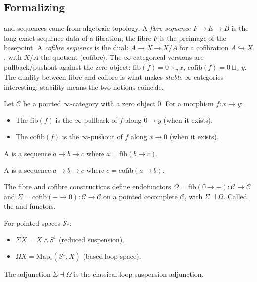 \subsection{Formalizing}

\begin{nameorigin}
 and  sequences come from algebraic topology.
A \emph{fibre sequence} $F \to E \to B$ is the long-exact-sequence
data of a fibration; the fibre $F$ is the preimage of the basepoint.
A \emph{cofibre sequence} is the dual: $A \to X \to X/A$ for a cofibration
$A \hookrightarrow X$, with $X/A$ the quotient (cofibre). The
$\infty$-categorical versions are pullback/pushout against the zero
object: $\mathrm{fib}(f) = 0 \times_y x$, $\mathrm{cofib}(f) = 0
\sqcup_x y$. The duality between fibre and cofibre is what makes
\emph{stable} $\infty$-categories interesting: stability means the two
notions coincide.
\end{nameorigin}

\begin{definition}
\label{def:fibre-cofibre}
Let $\mathcal{C}$ be a pointed $\infty$-category with a zero object $0$.
For a morphism $f : x \to y$:
\begin{itemize}
  \item The  $\mathrm{fib}(f)$ is the $\infty$-pullback of
        $f$ along $0 \to y$ (when it exists).
  \item The  $\mathrm{cofib}(f)$ is the $\infty$-pushout of
        $f$ along $x \to 0$ (when it exists).
\end{itemize}

A  is a sequence $a \to b \to c$ where $a = \mathrm{fib}(b \to c)$.

A  is a sequence $a \to b \to c$ where $c = \mathrm{cofib}(a \to b)$.
\end{definition}

\begin{theorem}
\label{thm:loop-suspension}
The fibre and cofibre constructions define endofunctors
$\Omega = \mathrm{fib}(0 \to -) : \mathcal{C} \to \mathcal{C}$ and
$\Sigma = \mathrm{cofib}(- \to 0) : \mathcal{C} \to \mathcal{C}$ on a
pointed cocomplete $\mathcal{C}$, with $\Sigma \dashv \Omega$. Called the
 and  functors.
\end{theorem}

\begin{example_thm}
\label{ex:loop-sus-spaces}
For pointed spaces $\mathcal{S}_*$:
\begin{itemize}
  \item $\Sigma X = X \wedge S^1$ (reduced suspension).
  \item $\Omega X = \mathrm{Map}_*(S^1, X)$ (based loop space).
\end{itemize}
The adjunction $\Sigma \dashv \Omega$ is the classical loop-suspension
adjunction.
\end{example_thm}


